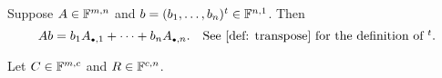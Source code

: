 \setcounter{thm}{49}
\begin{thm}
  Suppose $A \in \mathbb{F}^{m,n}$ and  $b = (b_1, \ldots, b_n)^{t}\in \mathbb{F}^{n,1}$. Then
  \begin{equation}
    Ab = b_1 A_{\mathsmaller{\bullet}, 1} + \dots + b_n A_{\mathsmaller{\bullet},n}. \quad $See \ref{def: transpose} for the definition of $^t.
  \end{equation}
\end{thm}

\begin{thm}
  \phantom{.} Let $C\in\mathbb{F}^{m,c}$ and $R\in\mathbb{F}^{c,n}$.


\end{thm}
